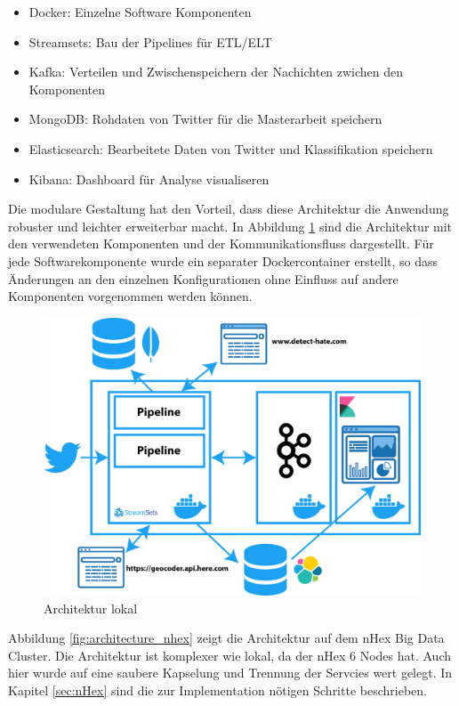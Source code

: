 \begin{itemize}
  \item Docker: Einzelne Software Komponenten
  \item Streamsets: Bau der Pipelines f{\"u}r ETL/ELT
  \item Kafka: Verteilen und Zwischenspeichern der Nachichten zwichen den Komponenten
  \item MongoDB: Rohdaten von Twitter f{\"u}r die Masterarbeit speichern
  \item Elasticsearch: Bearbeitete Daten von Twitter und Klassifikation speichern
  \item Kibana: Dashboard f{\"u}r Analyse visualiseren
\end{itemize}

Die modulare Gestaltung hat den Vorteil, dass diese Architektur die Anwendung robuster und leichter erweiterbar macht. In Abbildung \ref{fig:local_high_level_architecure} sind die Architektur mit den verwendeten Komponenten und der Kommunikationsfluss dargestellt. F{\"u}r jede Softwarekomponente wurde ein separater Dockercontainer erstellt, so dass {\"A}nderungen an den einzelnen Konfigurationen ohne Einfluss auf andere Komponenten vorgenommen werden k{\"o}nnen.

\begin{figure}[H]
	\centering
		\includegraphics[scale=0.4 ]{images/architecktur_high_level.png}
	\caption{Architektur lokal}
	\label{fig:local_high_level_architecure}
\end{figure}

Abbildung \ref{fig:architecture_nhex} zeigt die Architektur auf dem nHex Big Data Cluster. Die Architektur ist komplexer wie lokal, da der nHex 6 Nodes hat. Auch hier wurde auf eine saubere Kapselung und Trennung der Servcies wert gelegt. In Kapitel \ref{sec:nHex} sind die zur Implementation n{\"o}tigen Schritte beschrieben. 

